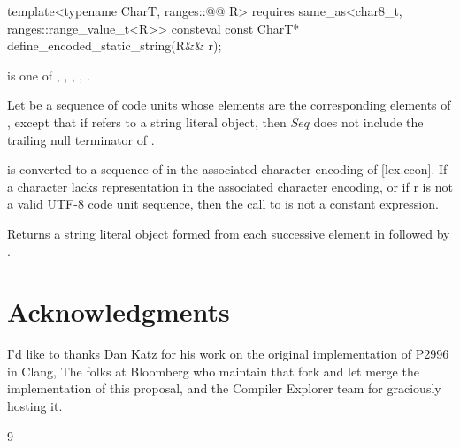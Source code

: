 \documentclass{wg21}
\begin{document}
\begin{addedblock}

%
\begin{itemdecl}
template<typename CharT, ranges::@@ R>
requires same_as<char8_t, ranges::range_value_t<R>>
consteval const CharT* define_encoded_static_string(R&& r);
\end{itemdecl}

\begin{itemdescr}

\mandates
{} is one of
,
,
,
,
.

Let  be a sequence of  code units
whose elements are the corresponding elements of ,
except that if  refers to a string literal object,
then $Seq$ does not include the trailing null terminator of .

 is converted to a sequence   of  in the associated character encoding of  [lex.ccon].
If a character lacks representation in the associated character encoding, or if r is not a valid UTF-8 code unit sequence, then the call to
 is not a constant expression.


\pnum
\effects
Returns a string literal object formed from each successive element in  followed by .
\end{itemdescr}

\end{addedblock}

\section{Acknowledgments}

I'd like to thanks Dan Katz for his work on the original implementation of P2996 in Clang,
The folks at Bloomberg who maintain that fork and let merge the implementation of this proposal,
and the Compiler Explorer team for graciously hosting it.




\renewcommand{\section}[2]{}%

\begin{thebibliography}{9}



\end{thebibliography}
\end{document}
